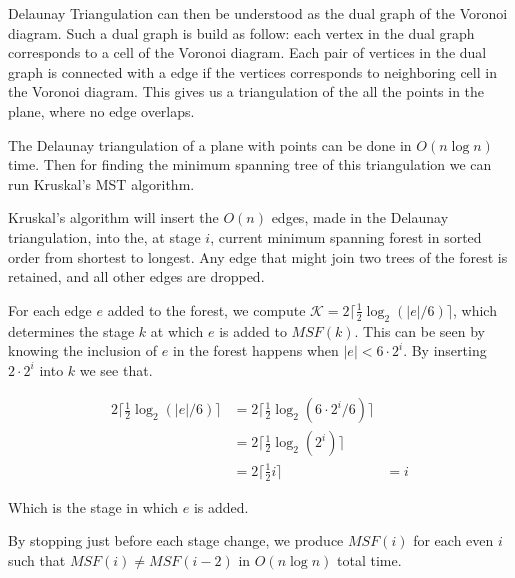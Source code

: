 Delaunay Triangulation can then be understood as the dual graph of the Voronoi diagram. Such a dual graph 
is build as follow: each vertex in the dual graph corresponds to a cell of the Voronoi diagram. Each pair 
of vertices in the dual graph is connected with a edge if the vertices corresponds to neighboring cell in the Voronoi 
diagram. This gives us a triangulation of the all the points in the plane, where no edge overlaps.

The Delaunay triangulation of a plane with points can be done in $O(n \log n)$ time\cite{CompGeo}. 
Then for finding the minimum spanning tree of this triangulation we can run Kruskal's MST 
algorithm\cite{IntroToAlg}. 

Kruskal's algorithm will insert the $O(n)$ edges, made in the Delaunay triangulation, into the, at 
stage $i$, current minimum spanning forest in sorted order from shortest to longest. Any edge that 
might join two trees of the forest is retained, and all other edges are dropped. 

For each edge $e$ added to the forest, we compute $\mathcal{K} = 2 \lceil \frac{1}{2} \log_2 (|e|/6) \rceil$, 
which determines the stage $k$ at which $e$ is added to $MSF(k)$. This can be seen by knowing the 
inclusion of $e$ in the forest happens when $|e| < 6 \cdot 2^i$. By inserting $ 2 \cdot 2^i$ into 
$k$ we see that. 

\begin{align*}
    2 \lceil \frac{1}{2} \log_2 (|e|/6) \rceil &= 2 \lceil \frac{1}{2} \log_2 (6 \cdot 2^i/6) \rceil \\
    &= 2 \lceil \frac{1}{2} \log_2 (2^i) \rceil \\
    &= 2 \lceil \frac{1}{2} i \rceil
    &= i
\end{align*}

Which is the stage in which $e$ is added. 

By stopping just before each stage change, we produce $MSF(i)$ for each even $i$ such that $MSF(i) \neq MSF(i-2)$ 
in $O(n \log n)$ total time.  

